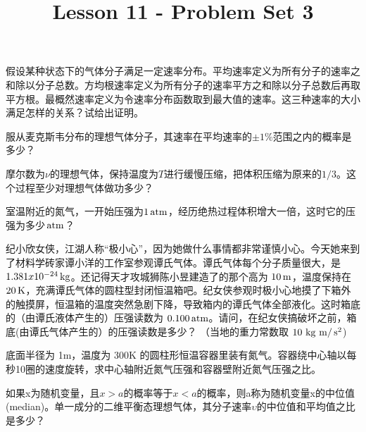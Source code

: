 \documentclass[CJK]{beamer}
\title{Lesson 11 - Problem Set 3}
\author{}
\date{}
\begin{document}

\begin{frame}
  \bchL
假设某种状态下的气体分子满足一定速率分布。平均速率定义为所有分子的速率之和除以分子总数。方均根速率定义为所有分子的速率平方之和除以分子总数后再取平方根。最概然速率定义为令速率分布函数取到最大值的速率。这三种速率的大小满足怎样的关系？试给出证明。  
\echL
\end{frame}



\begin{frame}
  \bchL
服从麦克斯韦分布的理想气体分子，其速率在平均速率的$\pm 1\%$范围之内的概率是多少？
  \echL
\end{frame}


\begin{frame}
  \bchL
摩尔数为$\nu$的理想气体，保持温度为$T$进行缓慢压缩，把体积压缩为原来的$1/3$。这个过程至少对理想气体做功多少？  
\echL
\end{frame}

\begin{frame}
  \bchL
  室温附近的氮气，一开始压强为$1\,\mathrm{atm}$，经历绝热过程体积增大一倍，这时它的压强为多少$\,\mathrm{atm}$？
  \echL
\end{frame}


\begin{frame}
  \bchL
  纪小欣女侠，江湖人称“极小心”，因为她做什么事情都非常谨慎小心。今天她来到了材料学砖家谭小洋的工作室参观谭氏气体。谭氏气体每个分子质量很大，是$1.381x10^{-24}\,\mathrm{kg}$。还记得天才攻城狮陈小昱建造了的那个高为 $10\,\mathrm{m}$，温度保持在$20\,\mathrm{K}$，充满谭氏气体的圆柱型封闭恒温箱吧。纪女侠参观时极小心地摸了下箱外的触摸屏，恒温箱的温度突然急剧下降，导致箱内的谭氏气体全部液化。这时箱底的（由谭氏液体产生的）压强读数为 $0.100\,\mathrm{atm}$。请问，在纪女侠搞破坏之前，箱底(由谭氏气体产生的）的压强读数是多少？
（当地的重力常数取 $10\,\,\mathrm{kg}\,\,\mathrm{m}/\,\mathrm{s}^2$) 
  \echL
\end{frame}


\begin{frame}
  \bchL
底面半径为 1m，温度为 300K 的圆柱形恒温容器里装有氮气。容器绕中心轴以每秒10圈的速度旋转，求中心轴附近氮气压强和容器壁附近氮气压强之比。
  \echL
\end{frame}


\begin{frame}
  \bchL
如果x为随机变量，且$x>a$的概率等于$x<a$的概率，则a称为随机变量x的中位值(median)。单一成分的二维平衡态理想气体，其分子速率$\upsilon$的中位值和平均值之比是多少？
  \echL
\end{frame}
\end{document}
